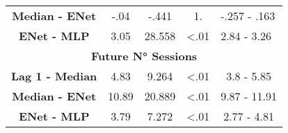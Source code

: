 \begin{table}[h]
\begin{tabular}{ccccc}
\textbf{Median - ENet}            & -.04                & -.441     &  1.  & \multicolumn{1}{l}{-.257 - .163} \\
\textbf{ENet - MLP}          & 3.05                & 28.558     & \textless .01  & \multicolumn{1}{l}{2.84 - 3.26} \\ \hline
\multicolumn{5}{c}{\textbf{Future N° Sessions}}                                                                      \\ \hline
\textbf{Lag 1 - Median} & 4.83                & 9.264     & \textless .01  & 3.8 - 5.85                     \\
\textbf{Median - ENet}            & 10.89                & 20.889     & \textless .01  & 9.87 - 11.91                     \\
\textbf{ENet - MLP}          & 3.79                & 7.272     & \textless .01  & 2.77 - 4.81                     \\\hline
\end{tabular}
\end{table}